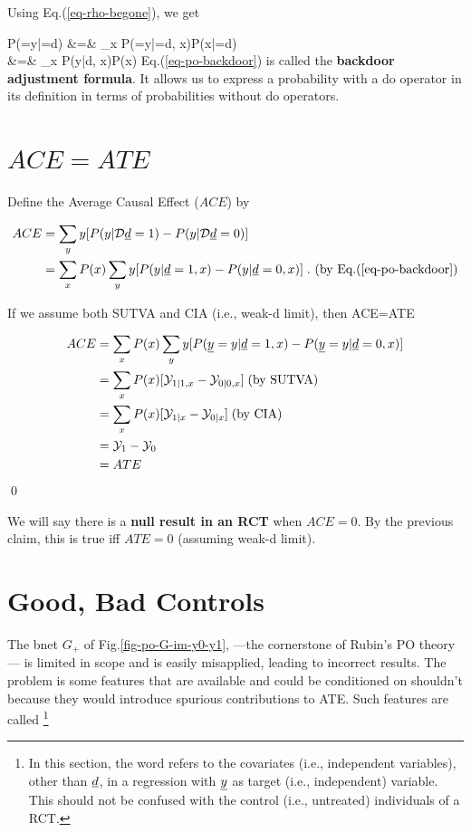 Using Eq.(\ref{eq-rho-begone}), we get

\beqa
P(\rvy=y|\cald\rvd=d)
&=&
\sum_x
P(\rvy=y|\cald\rvd=d, x)P(x|\cald\rvd=d)
\\
&=&
\sum_x
P(y|d, x)P(x)
\label{eq-po-backdoor}
\eeqa
Eq.(\ref{eq-po-backdoor})
is called the {\bf backdoor adjustment formula}.
It allows us to
express a
probability
with a do operator
in its definition
in terms
of  probabilities
without do operators.

\section{$ACE=ATE$}


Define the Average
Causal Effect ($ACE$) by

\begin{align}
ACE&=\sum_y y
[P(y|\cald\rvd=1)-P(y|\cald\rvd=0)]
\\
&=
\sum_x P(x)\sum_y y [P(y|\rvd=1,x)-P(y|\rvd=0,x)]
\;. \text{ (by Eq.(\ref{eq-po-backdoor})}
\label{eq-my-backdoor-proof}
\end{align}


\begin{claim}\label{cl-ace-ate}
If we assume both SUTVA and
CIA (i.e., weak-d limit), then
\beq
ACE=ATE
\eeq
\end{claim}
\proof



\begin{align}
ACE&=
\sum_x P(x)\sum_y y [P(\rvy=y|\rvd=1,x)-
P(\rvy=y|\rvd=0,x)]
\\
&=\sum_x P(x)[\caly_{1|1, x}-\caly_{0|0, x}]
\;\text{(by SUTVA)}
\\
&=\sum_x P(x)[\caly_{1|x}-\caly_{0|x}]
\;\text{(by CIA)}
\\
&=
\caly_{1}-\caly_{0}
\\
&=
ATE
\end{align}
\qed

We will say there is a {\bf null result
in an RCT} when $ACE=0$. By the previous claim,
this is true iff $ATE=0$
(assuming weak-d limit).

\section{Good, Bad Controls}

The bnet $G_+$
of Fig.\ref{fig-po-G-im-y0-y1},
---the cornerstone of Rubin's
PO theory--- is limited in scope
and is easily
misapplied, leading
to incorrect results.
The problem is
some features
that are available
and could be conditioned on
shouldn't because they
would introduce spurious
contributions to ATE.
Such features are called
\footnote{
In this section,
the word 
refers to the covariates
(i.e., independent
variables),
other than $\rvd$,
in a regression
with $\rvy$  as target
(i.e., independent)
variable.
This should
not be confused
with the
control
(i.e., untreated)
individuals
of a RCT.}

